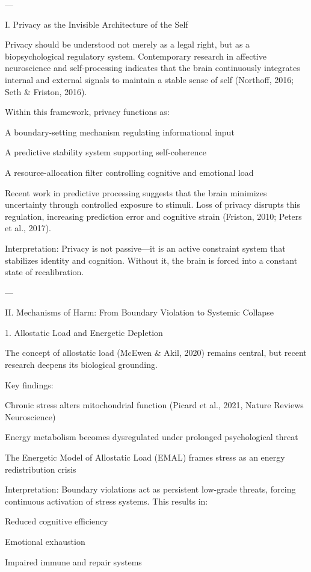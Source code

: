 ---

I. Privacy as the Invisible Architecture of the Self

Privacy should be understood not merely as a legal right, but as a biopsychological regulatory system. Contemporary research in affective neuroscience and self-processing indicates that the brain continuously integrates internal and external signals to maintain a stable sense of self (Northoff, 2016; Seth & Friston, 2016).

Within this framework, privacy functions as:

A boundary-setting mechanism regulating informational input

A predictive stability system supporting self-coherence

A resource-allocation filter controlling cognitive and emotional load


Recent work in predictive processing suggests that the brain minimizes uncertainty through controlled exposure to stimuli. Loss of privacy disrupts this regulation, increasing prediction error and cognitive strain (Friston, 2010; Peters et al., 2017).

Interpretation:
Privacy is not passive—it is an active constraint system that stabilizes identity and cognition. Without it, the brain is forced into a constant state of recalibration.


---

II. Mechanisms of Harm: From Boundary Violation to Systemic Collapse

1. Allostatic Load and Energetic Depletion

The concept of allostatic load (McEwen & Akil, 2020) remains central, but recent research deepens its biological grounding.

Key findings:

Chronic stress alters mitochondrial function (Picard et al., 2021, Nature Reviews Neuroscience)

Energy metabolism becomes dysregulated under prolonged psychological threat

The Energetic Model of Allostatic Load (EMAL) frames stress as an energy redistribution crisis


Interpretation:
Boundary violations act as persistent low-grade threats, forcing continuous activation of stress systems. This results in:

Reduced cognitive efficiency

Emotional exhaustion

Impaired immune and repair systems


